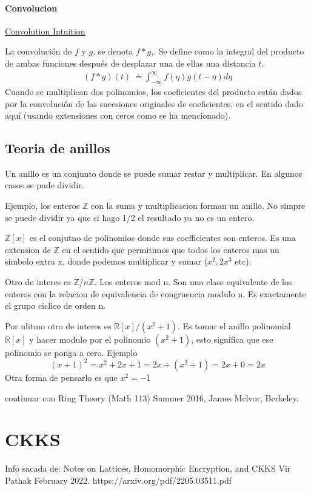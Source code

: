 \documentclass[12pt, oneside]{article}
\newcommand{\R}{\mathbb{R}}
\newcommand{\Z}{\mathbb{Z}}
\begin{document}
\paragraph{Convolucion} %
\href{https://betterexplained.com/articles/intuitive-convolution/}{Convolution Intuition}

La convolución de $f$ y $g$, se denota $f*g$,.
Se define como la integral del producto de ambas
funciones después de desplazar una de ellas una distancia $t$.
\begin{align*}
(f*g)(t)\ {\stackrel {\mathrm {.} }{=}}\int _{-\infty }^{\infty }f(\eta )g(t-\eta )d\eta
\end{align*}
Cuando se multiplican dos polinomios, los coeficientes del producto están dados
por la convolución de las sucesiones originales de coeficientes, en el sentido dado
aquí (usando extensiones con ceros como se ha mencionado).

\subsection{Teoria de anillos}
Un anillo es un conjunto donde se puede sumar restar y multiplicar.
En algunos casos se pude dividir.

Ejemplo, los enteros $\Z$ con la suma y multiplicacion forman un anillo.
No simpre se puede dividir ya que si hago 1/2 el resultado ya no es un entero.

$\Z[x]$ es el conjutno de polinomios donde sus coefficientes son enteros.
Es una extension de $\Z$ en el sentido que permitimos que todos los enteros
mas un simbolo extra x, donde podemos multiplicar y sumar ($x^2, 2x^3$ etc).

Otro de interes es  $\Z/n\Z$. Los enteros mod n.
Son una clase equivalente de los enteros con la relacion de equivalencia de congruencia
modulo n.
Es exactamente el grupo ciclico de orden n.

Por ulitmo otro de interes es $\R[x]/(x^2+1)$.
Es tomar el anillo polinomial $\R[x]$ y hacer modulo por el polinomio $(x^2+1)$,
esto significa que ese polinomio se ponga a cero.
Ejemplo
\begin{equation*}
  (x+1)^2 = x^2 + 2x + 1 = 2x + (x^2 + 1) = 2x + 0 = 2x
\end{equation*}
Otra forma de pensarlo es que $x^2 = -1$

continuar con Ring Theory (Math 113) Summer 2016, James Mclvor, Berkeley.

\section{CKKS}
Info sacada de:
Notes on Lattices, Homomorphic Encryption, and CKKS
Vir Pathak
February 2022.
https://arxiv.org/pdf/2205.03511.pdf
\end{document}
